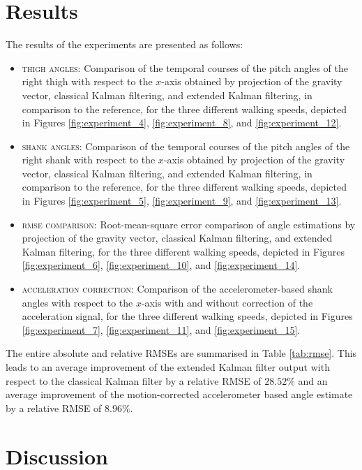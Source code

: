 \section{Results}

The results of the experiments are presented as follows:

\begin{itemize}
  \item \textsc{thigh angles:} Comparison of the temporal courses of the pitch angles of the right thigh with respect to the $x$-axis obtained by projection of the gravity vector, classical Kalman filtering, and extended Kalman filtering, in comparison to the reference, for the three different walking speeds, depicted in Figures \ref{fig:experiment_4}, \ref{fig:experiment_8}, and \ref{fig:experiment_12}.
  \item \textsc{shank angles:} Comparison of the temporal courses of the pitch angles of the right shank with respect to the $x$-axis obtained by projection of the gravity vector, classical Kalman filtering, and extended Kalman filtering, in comparison to the reference, for the three different walking speeds, depicted in Figures \ref{fig:experiment_5}, \ref{fig:experiment_9}, and \ref{fig:experiment_13}.
  \item \textsc{rmse comparison:} Root-mean-square error comparison of angle estimations by projection of the gravity vector, classical Kalman filtering, and extended Kalman filtering, for the three different walking speeds, depicted in Figures \ref{fig:experiment_6}, \ref{fig:experiment_10}, and \ref{fig:experiment_14}.
  \item \textsc{acceleration correction:} Comparison of the accelerometer-based shank angles with respect to the $x$-axis with and without correction of the acceleration signal, for the three different walking speeds, depicted in Figures \ref{fig:experiment_7}, \ref{fig:experiment_11}, and \ref{fig:experiment_15}.
\end{itemize}

\noindent
The entire absolute and relative RMSEs are summarised in Table \ref{tab:rmse}. This leads to an average improvement of the extended Kalman filter output with respect to the classical Kalman filter by a relative RMSE of $28.52\%$ and an average improvement of the motion-corrected accelerometer based angle estimate by a relative RMSE of $8.96\%$.

\section{Discussion}

